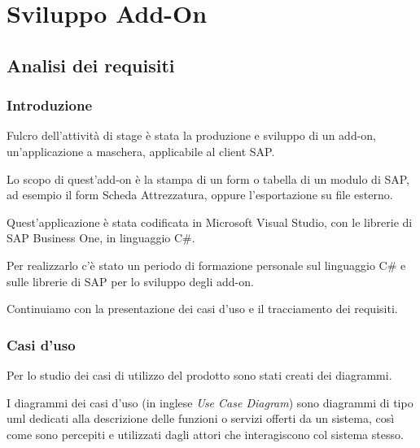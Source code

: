 
\chapter{Sviluppo Add-On}
\label{cap:sviluppo-addon}



\section{Analisi dei requisiti}
\subsection{Introduzione}

\begin{flushleft}
	\item Fulcro dell'attività di stage è stata la produzione e sviluppo di un add-on, un'applicazione a maschera, applicabile al client SAP.
	
	Lo scopo di quest'add-on è la stampa di un form o tabella di un modulo di SAP, ad esempio il form Scheda Attrezzatura, oppure l'esportazione su file esterno.
	\item Quest'applicazione è stata codificata in Microsoft Visual Studio, con le librerie di SAP Business One, in linguaggio C\#.
	
	Per realizzarlo c'è stato un periodo di formazione personale sul linguaggio C\# e sulle librerie di SAP per lo sviluppo degli add-on.
\end{flushleft}
\vspace{1em}


Continuiamo con la presentazione dei casi d'uso e il tracciamento dei requisiti.
\newpage

\subsection{Casi d'uso}
\begin{flushleft}
	Per lo studio dei casi di utilizzo del prodotto sono stati creati dei diagrammi.
	
	I diagrammi dei casi d'uso (in inglese \emph{Use Case Diagram}) sono diagrammi di tipo \gls{uml} dedicati alla descrizione delle funzioni o servizi offerti da un sistema, così come sono percepiti e utilizzati dagli attori che interagiscono col sistema stesso.
\end{flushleft}


